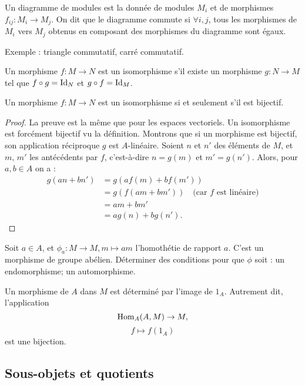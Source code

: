 \begin{definition}
Un diagramme de modules est la donnée de modules $M_i$ et de morphismes $f_{ij} : M_i \to M_j$. On dit que le diagramme commute si $\forall i, j$, tous les morphismes de $M_i$ vers $M_j$ obtenus en composant des morphismes du diagramme sont égaux.
\end{definition}

Exemple : triangle commutatif, carré commutatif.

\begin{definition}
Un morphisme $f : M\to N$ est un isomorphisme s'il existe un morphisme $g : N\to M$ tel que $f\circ g = \operatorname{Id}_N$ et $g\circ f=\operatorname{Id}_M$.
\end{definition}
\begin{proposition}
Un morphisme $f : M\to N$ est un isomorphisme si et seulement s'il est bijectif.
\end{proposition}
\begin{proof} La preuve est la même que pour les espaces vectoriels. Un isomorphisme est forcément bijectif vu la définition. Montrons que si un morphisme est bijectif, son application réciproque $g$ est $A$-linéaire. Soient $n$ et $n'$ des éléments de $M$, et $m$, $m'$ les antécédents par $f$, c'est-à-dire $n=g(m)$ et $m'=g(n')$. Alors, pour $a, b \in A$ on a :
\begin{align*}
g(an+bn') &= g(af(m)+bf(m'))\\
&= g(f(am+bm')) \quad \text{(car $f$ est linéaire)}\\
&=am+bm'\\
&=ag(n)+bg(n').
\end{align*}
\end{proof}


\begin{exo}
Soit $a\in A$, et $\phi_a : M\to M, m\mapsto am$ l'homothétie de rapport $a$. C'est un morphisme de groupe abélien. Déterminer des conditions pour que $\phi$ soit : un endomorphisme; un automorphisme. %
\end{exo}

\begin{remarque}
Un morphisme de $A$ dans $M$ est déterminé par l'image de $1_A$. Autrement dit, l'application
\[
\operatorname{Hom}_A(A,M) \to M,\]
\[f\mapsto f(1_A)
\]
est une bijection.
\end{remarque}

\subsection{Sous-objets et quotients}



